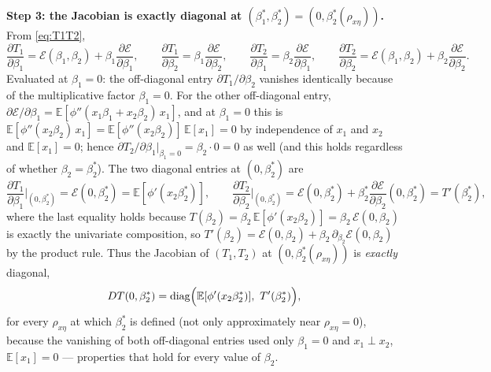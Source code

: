 \textbf{Step 3: the Jacobian is exactly diagonal at $(\beta_1^*,\beta_2^*)=(0,\beta_2^*(\rho_{x\eta}))$.}
From \eqref{eq:T1T2},
\[
\frac{\partial T_1}{\partial\beta_1} = \mathcal E(\beta_1,\beta_2) + \beta_1\frac{\partial\mathcal
E}{\partial\beta_1}, \qquad
\frac{\partial T_1}{\partial\beta_2} = \beta_1\frac{\partial\mathcal E}{\partial\beta_2}, \qquad
\frac{\partial T_2}{\partial\beta_1} = \beta_2\frac{\partial\mathcal E}{\partial\beta_1}, \qquad
\frac{\partial T_2}{\partial\beta_2} = \mathcal E(\beta_1,\beta_2) + \beta_2\frac{\partial\mathcal
E}{\partial\beta_2}.
\]
Evaluated at $\beta_1=0$: the off-diagonal entry $\partial T_1/\partial\beta_2$ vanishes identically
because of the multiplicative factor $\beta_1=0$. For the other off-diagonal entry,
$\partial\mathcal E/\partial\beta_1=\mathbb E[\phi''(x_1\beta_1+x_2\beta_2)\,x_1]$, and at $\beta_1=0$
this is $\mathbb E[\phi''(x_2\beta_2)\,x_1]=\mathbb E[\phi''(x_2\beta_2)]\,\mathbb E[x_1]=0$ by
independence of $x_1$ and $x_2$ and $\mathbb E[x_1]=0$; hence $\partial T_2/\partial\beta_1|_{\beta_1=0}
=\beta_2\cdot0=0$ as well (and this holds regardless of whether $\beta_2=\beta_2^*$). The two diagonal
entries at $(0,\beta_2^*)$ are
\[
\frac{\partial T_1}{\partial\beta_1}\bigg|_{(0,\beta_2^*)} = \mathcal E(0,\beta_2^*) =
\mathbb E[\phi'(x_2\beta_2^*)], \qquad
\frac{\partial T_2}{\partial\beta_2}\bigg|_{(0,\beta_2^*)} = \mathcal E(0,\beta_2^*) +
\beta_2^*\frac{\partial\mathcal E}{\partial\beta_2}(0,\beta_2^*) = T'(\beta_2^*),
\]
where the last equality holds because $T(\beta_2)=\beta_2\,\mathbb E[\phi'(x_2\beta_2)]=\beta_2\,
\mathcal E(0,\beta_2)$ is exactly the univariate composition, so $T'(\beta_2)=\mathcal
E(0,\beta_2)+\beta_2\,\partial_{\beta_2}\mathcal E(0,\beta_2)$ by the product rule. Thus the Jacobian of
$(T_1,T_2)$ at $(0,\beta_2^*(\rho_{x\eta}))$ is \emph{exactly} diagonal,
\[
D T(0,\beta_2^*) = \operatorname{diag}\Bigl(\mathbb E[\phi'(x_2\beta_2^*)],\ T'(\beta_2^*)\Bigr),
\]
for every $\rho_{x\eta}$ at which $\beta_2^*$ is defined (not only approximately near $\rho_{x\eta}=0$),
because the vanishing of both off-diagonal entries used only $\beta_1=0$ and $x_1\perp x_2$, $\mathbb
E[x_1]=0$ — properties that hold for every value of $\beta_2$.

